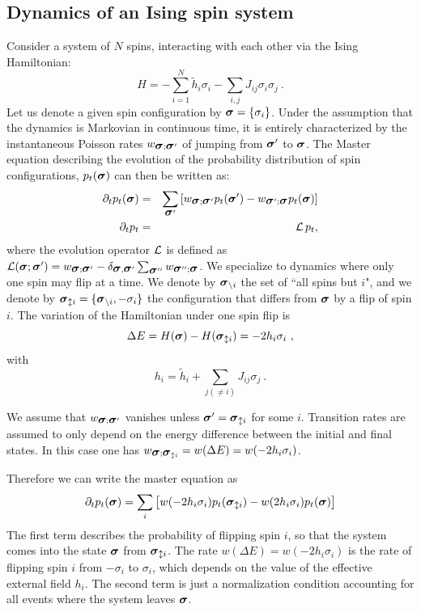 \documentclass[aps,twocolumn,floats,pre,amsmath,superscriptaddress]{revtex4}
\newcommand{\beq}{\begin{equation}}
\newcommand{\eeq}{\end{equation}}
\let\s=\sigma \let\t=\tau \let\f=\varphi \let\ph=\varphi\let\c=\chi
\newcommand{\<}{\langle}
\renewcommand{\>}{\rangle}
\newcommand{\bea}{\begin{eqnarray}}
\newcommand{\eea}{\end{eqnarray}}
\newcommand{\bs}{ \mbox{\boldmath$\sigma$}}
\begin{document}
\subsection{Dynamics of an Ising spin system}
\label{Notation}

Consider a system of $N$ spins, interacting with each other via the Ising Hamiltonian:
\beq
H=-\sum_{i=1}^N \tilde{h}_i \sigma_i -\sum_{i,j} J_{ij} \sigma_i \sigma_j \ .
\label{EqHam}
\eeq
Let us denote a given spin configuration by $\bs = \{\sigma_i\}$. 
Under the assumption that the dynamics is Markovian in continuous time, it is entirely characterized by the instantaneous Poisson rates $w_{\bs;\bs'}$ of jumping from $\bs'$ to $\bs$.
The Master equation describing the evolution of the probability distribution of spin configurations, $p_t(\bs)$  can then be written as:
\bea
\partial_t p_t(\bs) &=& \sum_{\bs'} \left[ w_{\bs;\bs'} p_t(\bs')
- w_{\bs';\bs} p_t(\bs) \right]\\
\partial_t p_t &=& {\cal L} \, p_t,
\eea
where the evolution operator $\cal L$ is defined as ${\cal L}(\bs;\bs')=w_{\bs;\bs'}-\delta_{\bs,\bs'}\sum_{\bs''}w_{\bs'';\bs}$.
We specialize to dynamics where only one spin may flip at a time.
We denote by $\bs_{\backslash i}$ the set of ``all spins but $i$", and we denote by
$\bs_{\updownarrow i} = \{\bs_{\backslash i} , -\sigma_i \}$ the configuration that differs from
$\bs$ by a flip of spin $i$.
The variation of the Hamiltonian under one spin flip is
\beq
\Delta E = H(\bs) - H(\bs_{\updownarrow i}) = - 2 h_i \s_i \ ,
\eeq
with
\beq
h_i = \tilde{h}_i + \sum_{j (\neq i)} J_{ij} \s_j \ .
\eeq

We assume that $w_{\bs;\bs'}$ vanishes unless $\bs' = \bs_{\updownarrow i}$ for some $i$. Transition rates are assumed to only depend on the energy difference between the initial and final states.
In this case one has $w_{\bs;\bs_{\updownarrow i}} = w(\Delta E) = w(-2 h_i \sigma_i)$.

Therefore we can write the master equation as
\beq
\partial_t p_t(\bs) =
\sum_i \left[ w(-2 h_i \sigma_i) p_t(\bs_{\updownarrow i}) - w(2 h_i\sigma_i) p_t(\bs)\right]
\label{mastereqn}
\eeq
The first term describes the probability of flipping spin $i$, 
so that the system comes into the state $\bs$ from $\bs_{\updownarrow i}$. 
The rate $w(\Delta E) = w(-2 h_i \sigma_i)$ is the rate of flipping spin $i$ 
from $-\sigma_i$ to $\sigma_i$, which depends on the value 
of the effective external field $h_i$. 
The second term is just a normalization condition accounting for all events where
the system leaves $\bs$.
\end{document}
